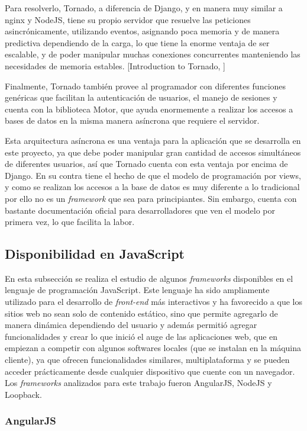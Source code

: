 Para resolverlo, Tornado, a diferencia de Django, y en manera muy similar a nginx y NodeJS, tiene su propio servidor que resuelve las peticiones asincrónicamente, utilizando eventos, asignando poca memoria y de manera predictiva dependiendo de la carga, lo que tiene la enorme ventaja de ser escalable, y de poder manipular muchas conexiones concurrentes manteniendo las necesidades de memoria estables. [Introduction to Tornado, \citet*{tornado}]

Finalmente, Tornado también provee al programador con diferentes funciones genéricas que facilitan la autenticación de usuarios, el manejo de sesiones y cuenta con la biblioteca Motor, que ayuda enormemente a realizar los accesos a bases de datos en la misma manera asíncrona que requiere el servidor.

Esta arquitectura asíncrona es una ventaja para la aplicación que se desarrolla en este proyecto, ya que debe poder manipular gran cantidad de accesos simultáneos de diferentes usuarios, así que Tornado cuenta con esta ventaja por encima de Django. En su contra tiene el hecho de que el modelo de programación por views, y como se realizan los accesos a la base de datos es muy diferente a lo tradicional por ello no es un \textit{framework} que sea para principiantes. Sin embargo, cuenta con bastante documentación oficial para desarrolladores que ven el modelo por primera vez, lo que facilita la labor.

\subsection{Disponibilidad en JavaScript}

En esta subsección se realiza el estudio de algunos \textit{frameworks} disponibles en el lenguaje de programación JavaScript. Este lenguaje ha sido ampliamente utilizado para el desarrollo de \textit{front-end} más interactivos y ha favorecido a que los sitios web no sean solo de contenido estático, sino que permite agregarlo de manera dinámica dependiendo del usuario y además permitió agregar funcionalidades y crear  lo que inició el auge de las aplicaciones web, que en empiezan a competir con algunos softwares locales (que se instalan en la máquina cliente), ya que ofrecen funcionalidades similares, multiplataforma y se pueden acceder prácticamente desde cualquier dispositivo que cuente con un navegador. Los \textit{frameworks} analizados para este trabajo fueron AngularJS, NodeJS y Loopback.

\subsubsection{AngularJS}

